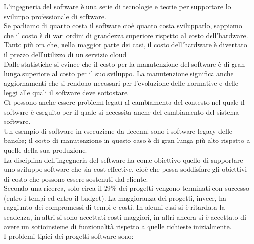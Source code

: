 L'ingegneria del software è una serie di tecnologie e teorie per supportare lo sviluppo professionale di software.\\
Se parliamo di quanto costa il software cioè quanto costa svilupparlo, sappiamo che il costo è di vari ordini di grandezza superiore rispetto al costo dell'hardware.
Tanto più ora che, nella maggior parte dei casi, il costo dell'hardware è diventato il prezzo dell'utilizzo di un servizio cloud.\\
Dalle statistiche si evince che il costo per la manutenzione del software è di gran lunga superiore al costo per il suo sviluppo.
La manutenzione significa anche aggiornamenti che si rendono necessari per l'evoluzione delle normative e delle leggi alle quali il software deve sottostare.\\
Ci possono anche essere problemi legati al cambiamento del contesto nel quale il software è eseguito per il quale si necessita anche del cambiamento del sistema software.\\
Un esempio di software in esecuzione da decenni sono i software legacy delle banche; il costo di manutenzione in questo caso è di gran lunga più alto rispetto a quello della sua produzione.\\
La disciplina dell'ingegneria del software ha come obiettivo quello di supportare uno sviluppo software che sia cost-effective, cioè che possa soddisfare gli obiettivi di costo che possono essere sostenuti dal cliente.\\
Secondo una ricerca, solo circa il 29\% dei progetti vengono terminati con successo (entro i tempi ed entro il budget).
La maggioranza dei progetti, invece, ha raggiunto dei compromessi di tempi e costi.
In alcuni casi si è ritardata la scadenza, in altri si sono accettati costi maggiori, in altri ancora si è accettato di avere un sottoinsieme di funzionalità rispetto a quelle richieste inizialmente.\\
I problemi tipici dei progetti software sono:
